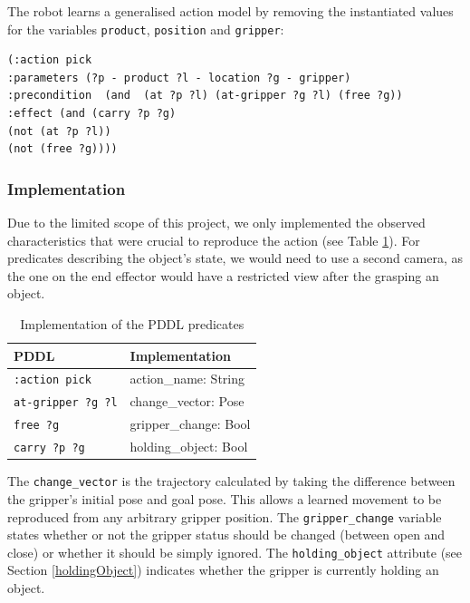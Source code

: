 The robot learns a generalised action model by removing the instantiated values for the variables \texttt{product}, \texttt{position} and \texttt{gripper}:

\begin{verbatim}
(:action pick
:parameters (?p - product ?l - location ?g - gripper)
:precondition  (and  (at ?p ?l) (at-gripper ?g ?l) (free ?g))
:effect (and (carry ?p ?g)
(not (at ?p ?l)) 
(not (free ?g))))
\end{verbatim}

\subsubsection{Implementation}
Due to the limited scope of this project, we only implemented the observed characteristics that were crucial to reproduce the action (see Table \ref{tab:PDDL implementation}).
For predicates describing the object's state, we would need to use a second camera, as the one on the end effector would have a restricted view after the grasping an object.

\begin{table}[h]
	\begin{center}
		\begin{tabular}{l|l}
			PDDL & Implementation\\ \hline
			\texttt{:action pick} & action_name: String\\
			\texttt{at-gripper ?g ?l} & change_vector: Pose\\
			\texttt{free ?g } & gripper_change: Bool\\
			\texttt{carry ?p ?g} & holding_object: Bool
		\end{tabular}
		\label{tab:PDDL implementation}
		\caption{Implementation of the PDDL predicates}
	\end{center}
\end{table}

The \texttt{change_vector} is the trajectory calculated by taking the difference between the gripper's initial pose and goal pose.
This allows a learned movement to be reproduced from any arbitrary gripper position.
The \texttt{gripper_change} variable states whether or not the gripper status should be changed (between open and close) or whether it should be simply ignored.
The \texttt{holding_object} attribute (see Section \ref{holdingObject}) indicates whether the gripper is currently holding an object.

